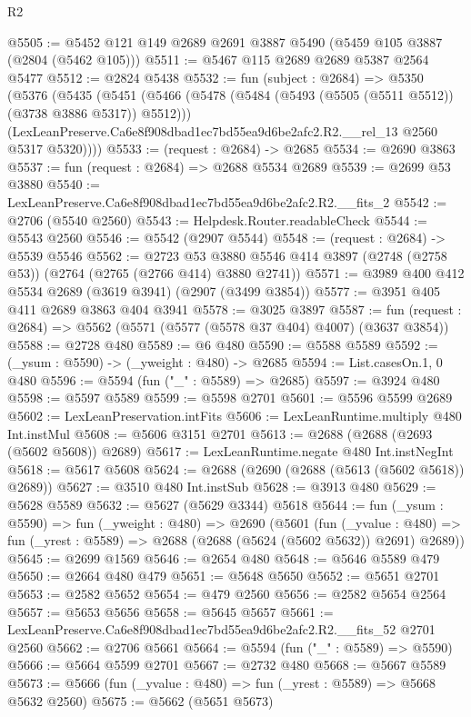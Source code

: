 \begin{lexlean}{R2}
\begin{coremodule}
@5505 := @5452 @121 @149 @2689 @2691 @3887 @5490 (@5459 @105 @3887 (@2804 (@5462 @105)))
@5511 := @5467 @115 @2689 @2689 @5387 @2564 @5477
@5512 := @2824 @5438
@5532 := fun (subject : @2684) =>
  @5350
    (@5376
      (@5435
        (@5451
          (@5466 (@5478 (@5484 (@5493 (@5505 (@5511 @5512)) (@3738 @3886 @5317)) @5512)))
          (LexLeanPreserve.Ca6e8f908dbad1ec7bd55ea9d6be2afc2.R2.__rel_13 @2560 @5317 @5320))))
@5533 := (request : @2684) -> @2685
@5534 := @2690 @3863
@5537 := fun (request : @2684) => @2688 @5534 @2689
@5539 := @2699 @53 @3880
@5540 := LexLeanPreserve.Ca6e8f908dbad1ec7bd55ea9d6be2afc2.R2.__fits_2
@5542 := @2706 (@5540 @2560)
@5543 := Helpdesk.Router.readableCheck
@5544 := @5543 @2560
@5546 := @5542 (@2907 @5544)
@5548 := (request : @2684) -> @5539 @5546
@5562 := @2723
    @53
    @3880
    @5546
    @414
    @3897
    (@2748 (@2758 @53))
    (@2764 (@2765 (@2766 @414) @3880 @2741))
@5571 := @3989 @400 @412 @5534 @2689 (@3619 @3941) (@2907 (@3499 @3854))
@5577 := @3951 @405 @411 @2689 @3863 @404 @3941
@5578 := @3025 @3897
@5587 := fun (request : @2684) => @5562 (@5571 (@5577 (@5578 @37 @404) @4007) (@3637 @3854))
@5588 := @2728 @480
@5589 := @6 @480
@5590 := @5588 @5589
@5592 := (_ysum : @5590) -> (_yweight : @480) -> @2685
@5594 := List.casesOn.{1, 0} @480
@5596 := @5594 (fun ("_" : @5589) => @2685)
@5597 := @3924 @480
@5598 := @5597 @5589
@5599 := @5598 @2701
@5601 := @5596 @5599 @2689
@5602 := LexLeanPreservation.intFits
@5606 := LexLeanRuntime.multiply @480 Int.instMul
@5608 := @5606 @3151 @2701
@5613 := @2688 (@2688 (@2693 (@5602 @5608)) @2689)
@5617 := LexLeanRuntime.negate @480 Int.instNegInt
@5618 := @5617 @5608
@5624 := @2688 (@2690 (@2688 (@5613 (@5602 @5618)) @2689))
@5627 := @3510 @480 Int.instSub
@5628 := @3913 @480
@5629 := @5628 @5589
@5632 := @5627 (@5629 @3344) @5618
@5644 := fun (_ysum : @5590) =>
  fun (_yweight : @480) =>
  @2690
    (@5601
      (fun (_yvalue : @480) =>
      fun (_yrest : @5589) => @2688 (@2688 (@5624 (@5602 @5632)) @2691) @2689))
@5645 := @2699 @1569
@5646 := @2654 @480
@5648 := @5646 @5589 @479
@5650 := @2664 @480 @479
@5651 := @5648 @5650
@5652 := @5651 @2701
@5653 := @2582 @5652
@5654 := @479 @2560
@5656 := @2582 @5654 @2564
@5657 := @5653 @5656
@5658 := @5645 @5657
@5661 := LexLeanPreserve.Ca6e8f908dbad1ec7bd55ea9d6be2afc2.R2.__fits_52 @2701 @2560
@5662 := @2706 @5661
@5664 := @5594 (fun ("_" : @5589) => @5590)
@5666 := @5664 @5599 @2701
@5667 := @2732 @480
@5668 := @5667 @5589
@5673 := @5666 (fun (_yvalue : @480) => fun (_yrest : @5589) => @5668 @5632 @2560)
@5675 := @5662 (@5651 @5673)

\end{coremodule}
\end{lexlean}
